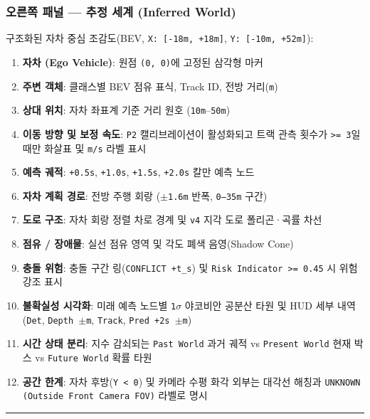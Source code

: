 \documentclass[10.5pt,a4paper]{article}
\begin{document}
\subsubsection{오른쪽 패널 --- 추정 세계 (Inferred World)}
구조화된 자차 중심 조감도(BEV, \texttt{X:\allowbreak{} [-\allowbreak{}18m,\allowbreak{} +18m]}, \texttt{Y:\allowbreak{} [-\allowbreak{}10m,\allowbreak{} +52m]}):

\begin{enumerate}[leftmargin=1.8em,itemsep=2pt]
\item \textbf{자차 (Ego Vehicle)}: 원점 \texttt{(0,\allowbreak{} 0)}에 고정된 삼각형 마커
\item \textbf{주변 객체}: 클래스별 BEV 점유 표식, Track ID, 전방 거리(\texttt{m})
\item \textbf{상대 위치}: 자차 좌표계 기준 거리 원호 (\texttt{10m}--\texttt{50m})
\item \textbf{이동 방향 및 보정 속도}: \texttt{P2} 캘리브레이션이 활성화되고 트랙 관측 횟수가 \texttt{>= 3}일 때만 화살표 및 \texttt{m/\allowbreak{}s} 라벨 표시
\item \textbf{예측 궤적}: \texttt{+0.\allowbreak{}5s}, \texttt{+1.\allowbreak{}0s}, \texttt{+1.\allowbreak{}5s}, \texttt{+2.\allowbreak{}0s} 칼만 예측 노드
\item \textbf{자차 계획 경로}: 전방 주행 회랑 (\texttt{$\pm$1.\allowbreak{}6m} 반폭, \texttt{0--35m} 구간)
\item \textbf{도로 구조}: 자차 회랑 정렬 차로 경계 및 \texttt{v4} 지각 도로 폴리곤·곡률 차선
\item \textbf{점유 / 장애물}: 실선 점유 영역 및 각도 폐색 음영(Shadow Cone)
\item \textbf{충돌 위험}: 충돌 구간 링(\texttt{CONFLICT +t\_\allowbreak{}s}) 및 \texttt{Risk Indicator >= 0.\allowbreak{}45} 시 위험 강조 표시
\item \textbf{불확실성 시각화}: 미래 예측 노드별 \texttt{1$\sigma$} 야코비안 공분산 타원 및 HUD 세부 내역(\texttt{Det}, \texttt{Depth $\pm$m}, \texttt{Track}, \texttt{Pred +2s $\pm$m})
\item \textbf{시간 상태 분리}: 지수 감쇠되는 \texttt{Past World} 과거 궤적 vs \texttt{Present World} 현재 박스 vs \texttt{Future World} 확률 타원
\item \textbf{공간 한계}: 자차 후방(\texttt{Y < 0}) 및 카메라 수평 화각 외부는 대각선 해칭과 \texttt{UNKNOWN (Outside Front Camera FOV)} 라벨로 명시
\end{enumerate}

\par\noindent\rule{\textwidth}{0.4pt}\par\medskip
\end{document}
